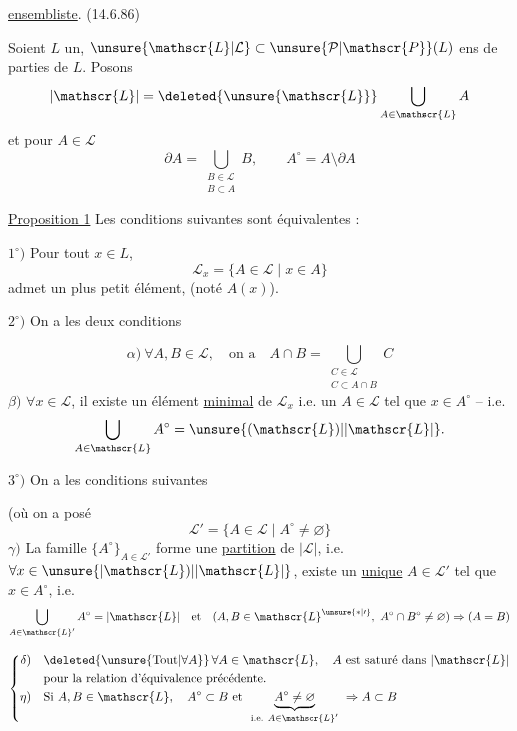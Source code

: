 \uline{ ensembliste}. \quad (14.6.86)

Soient $L$ un, $\unsure{\mathscr{L}|\mathcal{L}}\subset\unsure{\mathcal{P}|\mathscr{P}}(L)$ ens de parties de $L$. Posons
\[
|\mathscr{L}|=\deleted{\unsure{\mathscr{L}}}\bigcup_{A\in\mathscr{L}}A
\]
et pour $A\in\mathscr{L}$
\[
\partial A=\bigcup_{\substack{B\in\mathscr{L}\\B\subset A}}B,\qquad A^\circ=A\setminus\partial A
\]

\uline{Proposition 1} Les conditions suivantes sont équivalentes :

$1^\circ)$ Pour tout $x\in L$,  
\[
\mathscr{L}_x=\{A\in\mathscr{L}\mid x\in A\}
\]
admet un plus petit élément, (noté $A(x)$).

$2^\circ)$ On a les deux conditions

\[
\alpha)\ \forall A,B\in\mathscr{L},\quad\text{on a}\quad
 A\cap B=\bigcup_{\substack{C\in\mathscr{L}\\C\subset A\cap B}}C
\]
$\beta)$ $\forall x\in\mathscr{L}$, il existe un élément \uline{minimal} de $\mathscr{L}_x$ i.e. un $A\in\mathscr{L}$ tel que $x\in A^\circ$ -- i.e.
\[
\bigcup_{A\in\mathscr{L}}A^\circ=\unsure{(\mathscr{L})|\lvert\mathscr{L}\rvert}.
\]

$3^\circ)$ On a les  conditions suivantes

(où  on a posé
\[
\mathscr{L}'=\{A\in\mathscr{L}\mid A^\circ\ne\varnothing\}
\]
$\gamma)$ La famille $\{A^\circ\}_{A\in\mathscr{L}'}$ forme une \uline{partition} de $|\mathscr{L}|$, i.e. $\forall x\in\unsure{\lvert\mathscr{L})|\lvert\mathscr{L}\rvert}$, \deleted{\unsure{\ensuremath{\exists!}}} existe un \uline{unique} $A\in\mathscr{L}'$ tel que $x\in A^\circ$, i.e.
\[
\bigcup_{A\in\mathscr{L}'} A^\circ=|\mathscr{L}|\quad\text{et}\quad
(A,B\in\mathscr{L}^{\unsure{*|\prime}},\ A^\circ\cap B^\circ\ne\varnothing)\Rightarrow(A=B)
\]

\[
\left\{\begin{aligned}
\delta)&\quad \deleted{\unsure{\text{Tout}|\forall A}}\,\forall A\in\mathscr{L},\quad A\ \text{est saturé dans }|\mathscr{L}|\\
 &\quad\text{pour la relation d'équivalence précédente.}\\
\eta)&\quad\text{Si } A,B\in\mathscr{L},\quad A^\circ\subset B\ \text{et }\
 \underset{\text{i.e. } A\in\mathscr{L}'}{\underbrace{A^\circ\ne\varnothing}}\ \Rightarrow A\subset B
\end{aligned}\right.
\]
